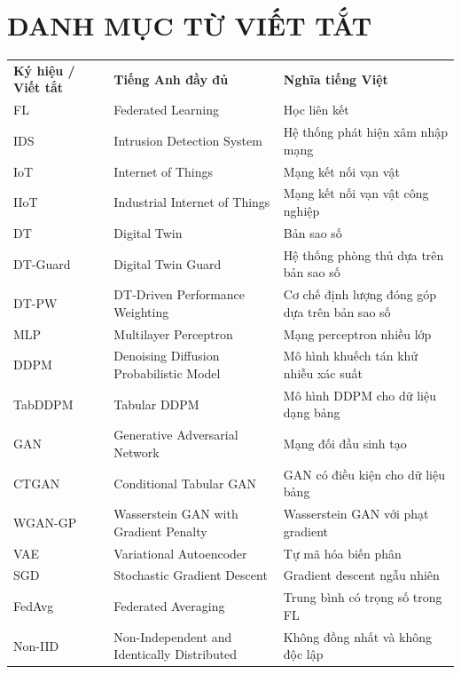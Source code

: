 \section{DANH MỤC TỪ VIẾT TẮT}\label{danh-mux1ee5c-tux1eeb-viux1ebft-tux1eaft}

{\def\LTcaptype{none} %
\begin{longtable}[]{@{}
  >{\centering\arraybackslash}p{}
  >{\centering\arraybackslash}p{}
  >{\centering\arraybackslash}p{}@{}}
\toprule\noalign{}
\endhead
\bottomrule\noalign{}
\endlastfoot
\textbf{Ký hiệu / Viết tắt} & \textbf{Tiếng Anh đầy đủ} & \textbf{Nghĩa tiếng Việt} \\
FL & Federated Learning & Học liên kết \\
IDS & Intrusion Detection System & Hệ thống phát hiện xâm nhập mạng \\
IoT & Internet of Things & Mạng kết nối vạn vật \\
IIoT & Industrial Internet of Things & Mạng kết nối vạn vật công nghiệp \\
DT & Digital Twin & Bản sao số \\
DT-Guard & Digital Twin Guard & Hệ thống phòng thủ dựa trên bản sao số \\
DT-PW & DT-Driven Performance Weighting & Cơ chế định lượng đóng góp dựa trên bản sao số \\
MLP & Multilayer Perceptron & Mạng perceptron nhiều lớp \\
DDPM & Denoising Diffusion Probabilistic Model & Mô hình khuếch tán khử nhiễu xác suất \\
TabDDPM & Tabular DDPM & Mô hình DDPM cho dữ liệu dạng bảng \\
GAN & Generative Adversarial Network & Mạng đối đầu sinh tạo \\
CTGAN & Conditional Tabular GAN & GAN có điều kiện cho dữ liệu bảng \\
WGAN-GP & Wasserstein GAN with Gradient Penalty & Wasserstein GAN với phạt gradient \\
VAE & Variational Autoencoder & Tự mã hóa biến phân \\
SGD & Stochastic Gradient Descent & Gradient descent ngẫu nhiên \\
FedAvg & Federated Averaging & Trung bình có trọng số trong FL \\
Non-IID & Non-Independent and Identically Distributed & Không đồng nhất và không độc lập \\

\end{longtable}}
